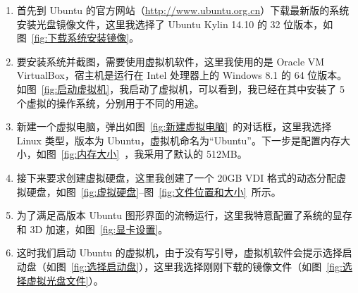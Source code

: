 \documentclass[cs4size,a4paper,nofonts]{ctexart}
\begin{document}
\begin{enumerate}

\item 首先到 Ubuntu 的官方网站（\url{http://www.ubuntu.org.cn}）下载最新版的系统安装光盘镜像文件，这里我选择了 Ubuntu Kylin 14.10 的 32 位版本，如图~\ref{fig:下载系统安装镜像}。

\item 要安装系统并截图，需要使用虚拟机软件，这里我使用的是 Oracle VM VirtualBox，宿主机是运行在 Intel 处理器上的 Windows 8.1 的 64 位版本。如图~\ref{fig:启动虚拟机}，我启动了虚拟机，可以看到，我已经在其中安装了 5 个虚拟的操作系统，分别用于不同的用途。

\begin{figure}[htp]
\end{figure}

\item 新建一个虚拟电脑，弹出如图~\ref{fig:新建虚拟电脑}~的对话框，这里我选择 Linux 类型，版本为 Ubuntu，虚拟机命名为“Ubuntu”。下一步是配置内存大小，如图~\ref{fig:内存大小}~，我采用了默认的 512MB。

\begin{figure}[htp]
\end{figure}

\item 接下来要求创建虚拟硬盘，这里我创建了一个 20GB VDI 格式的动态分配虚拟硬盘，如图~\ref{fig:虚拟硬盘}--图~\ref{fig:文件位置和大小}~所示。

\begin{figure}[htp]
\end{figure}

\item 为了满足高版本 Ubuntu 图形界面的流畅运行，这里我特意配置了系统的显存和 3D 加速，如图~\ref{fig:显卡设置}。

\item 这时我们启动 Ubuntu 的虚拟机，由于没有写引导，虚拟机软件会提示选择启动盘（如图~\ref{fig:选择启动盘}），这里我选择刚刚下载的镜像文件（如图~\ref{fig:选择虚拟光盘文件}）。

\begin{figure}[htp]
\end{figure}


\end{enumerate}
\end{document}
